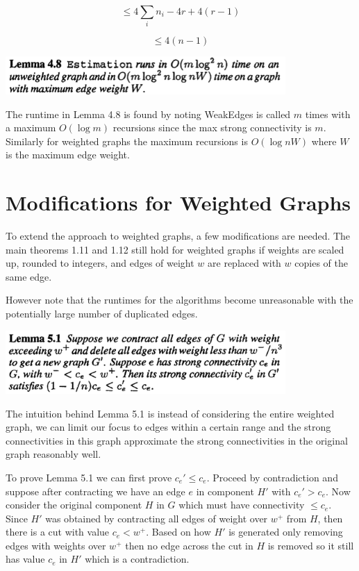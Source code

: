 \documentclass[11pt]{article}
\begin{document}
\[
\le 4\sum_i{n_i} - 4r + 4(r-1)
\]

\[
\le 4(n-1)
\]

\begin{center}
\includegraphics[width=0.8\textwidth]{figures/Lemma4_8.png}
\end{center}

The runtime in Lemma 4.8 is found by noting WeakEdges is called $m$ times with a maximum $O(\log m)$ recursions since the max strong connectivity is $m$. Similarly for weighted graphs the maximum recursions is $O(\log nW)$ where $W$ is the maximum edge weight. 

\section{Modifications for Weighted Graphs}

To extend the approach to weighted graphs, a few modifications are needed. The main theorems 1.11 and 1.12 still hold for weighted graphs if weights are scaled up, rounded to integers, and edges of weight $w$ are replaced with $w$ copies of the same edge. 

However note that the runtimes for the algorithms become unreasonable with the potentially large number of duplicated edges. 

\begin{center}
\includegraphics[width=0.8\textwidth]{figures/Lemma5_1.png}
\end{center}

The intuition behind Lemma 5.1 is instead of considering the entire weighted graph, we can limit our focus to edges within a certain range and the strong connectivities in this graph approximate the strong connectivities in the original graph reasonably well.

To prove Lemma 5.1 we can first prove $c_e' \le c_e$. Proceed by contradiction and suppose after contracting we have an edge $e$ in component $H'$ with $c_e' > c_e$. Now consider the original component $H$ in $G$ which must have connectivity $ \le c_e$. Since $H'$ was obtained by contracting all edges of weight over $w^+$ from $H$, then there is a cut with value $c_e < w^+$. Based on how $H'$ is generated only removing edges with weights over $w^+$ then no edge across the cut in $H$ is removed so it still has value $c_e$ in $H'$ which is a contradiction.
\end{document}
